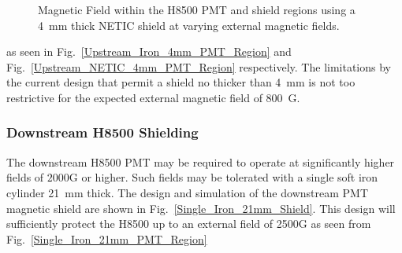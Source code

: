 \documentclass[12pt]{article}
\begin{document}
\begin{figure}[ht]
\centering
{}
\qquad
{}
\caption{\small{Magnetic Field within the H8500 PMT and shield regions using a 4~mm thick NETIC shield at varying external magnetic fields.}}\label{Upstream_NETIC_4mm}
\end{figure}


as seen in Fig.~\ref{Upstream_Iron_4mm_PMT_Region} and 
Fig.~\ref{Upstream_NETIC_4mm_PMT_Region} respectively.
 The limitations by the current design 
that permit a shield no thicker than 4~mm is not  too restrictive for the expected 
external magnetic field of 800~G.





\subsubsection{Downstream H8500 Shielding}

The downstream H8500 PMT may be required to operate at significantly 
higher fields of $2000$G or higher.  Such fields may be tolerated with  a single  soft iron cylinder 21~mm thick.
The design and simulation of the downstream PMT magnetic shield
are  shown in Fig.~\ref{Single_Iron_21mm_Shield}.
This design  will sufficiently protect the H8500 up to an external field of 2500G  
as seen from Fig.~\ref{Single_Iron_21mm_PMT_Region}
\end{document}
